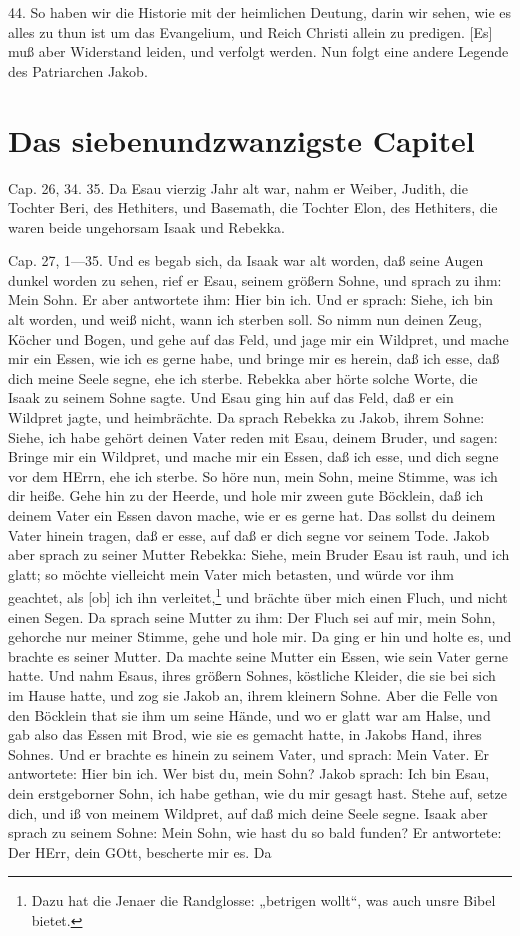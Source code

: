 44. So haben wir die Historie mit der heimlichen Deutung, darin wir sehen, wie es alles zu thun ist um das Evangelium, und Reich Christi allein zu predigen. [Es] muß aber Widerstand leiden, und verfolgt werden. Nun folgt eine andere Legende des Patriarchen Jakob.

\section{Das siebenundzwanzigste Capitel}

Cap. 26, 34. 35. Da Esau vierzig Jahr alt war, nahm er Weiber, Judith, die Tochter Beri, des Hethiters, und Basemath, die Tochter Elon, des Hethiters, die waren beide ungehorsam Isaak und Rebekka.

Cap. 27, 1—35. Und es begab sich, da Isaak war alt worden, daß seine Augen dunkel worden zu sehen, rief er Esau, seinem größern Sohne, und sprach zu ihm: Mein Sohn. Er aber antwortete ihm: Hier bin ich. Und er sprach: Siehe, ich bin alt worden, und weiß nicht, wann ich sterben soll. So nimm nun deinen Zeug, Köcher und Bogen, und gehe auf das Feld, und jage mir ein Wildpret, und mache mir ein Essen, wie ich es gerne habe, und bringe mir es herein, daß ich esse, daß dich meine Seele segne, ehe ich sterbe. Rebekka aber hörte solche Worte, die Isaak zu seinem Sohne sagte. Und Esau ging hin auf das Feld, daß er ein Wildpret jagte, und heimbrächte. Da sprach Rebekka zu Jakob, ihrem Sohne: Siehe, ich habe gehört deinen Vater reden mit Esau, deinem Bruder, und sagen: Bringe mir ein Wildpret, und mache mir ein Essen, daß ich esse, und dich segne vor dem HErrn, ehe ich sterbe. So höre nun, mein Sohn, meine Stimme, was ich dir heiße. Gehe hin zu der Heerde, und hole mir zween gute Böcklein, daß ich deinem Vater ein Essen davon mache, wie er es gerne hat. Das sollst du deinem Vater hinein tragen, daß er esse, auf daß er dich segne vor seinem Tode. Jakob aber sprach zu seiner Mutter Rebekka: Siehe, mein Bruder Esau ist rauh, und ich glatt; so möchte vielleicht mein Vater mich betasten, und würde vor ihm geachtet, als [ob] ich ihn verleitet,\footnote{Dazu hat die Jenaer die Randglosse: „betrigen wollt“, was auch unsre Bibel bietet.} und brächte über mich einen Fluch, und nicht einen Segen. Da sprach seine Mutter zu ihm: Der Fluch sei auf mir, mein Sohn, gehorche nur meiner Stimme, gehe und hole mir. Da ging er hin und holte es, und brachte es seiner Mutter. Da machte seine Mutter ein Essen, wie sein Vater gerne hatte. Und nahm Esaus, ihres größern Sohnes, köstliche Kleider, die sie bei sich im Hause hatte, und zog sie Jakob an, ihrem kleinern Sohne. Aber die Felle von den Böcklein that sie ihm um seine Hände, und wo er glatt war am Halse, und gab also das Essen mit Brod, wie sie es gemacht hatte, in Jakobs Hand, ihres Sohnes. Und er brachte es hinein zu seinem Vater, und sprach: Mein Vater. Er antwortete: Hier bin ich. Wer bist du, mein Sohn? Jakob sprach: Ich bin Esau, dein erstgeborner Sohn, ich habe gethan, wie du mir gesagt hast. Stehe auf, setze dich, und iß von meinem Wildpret, auf daß mich deine Seele segne. Isaak aber sprach zu seinem Sohne: Mein Sohn, wie hast du so bald funden? Er antwortete: Der HErr, dein GOtt, bescherte mir es. Da 